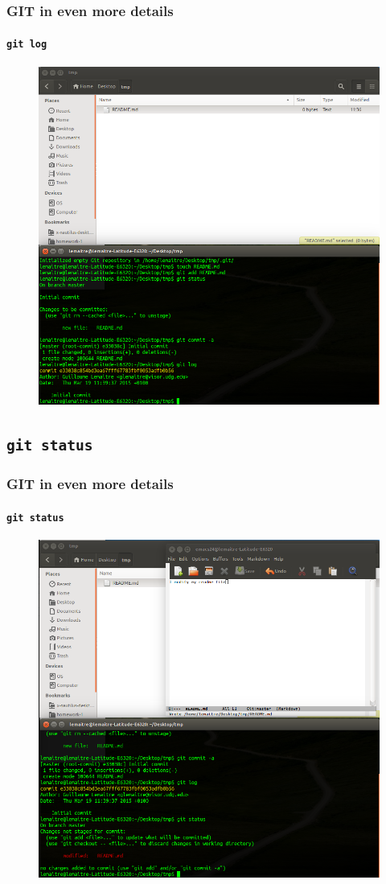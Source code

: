 \documentclass{beamer}
\begin{document}
\begin{frame}
  \frametitle{GIT in even more details}
  \framesubtitle{\texttt{git log}}
  \begin{figure}
      \centering
      \includegraphics[width=.65\textwidth]{./images/workflow/log.png}
    \end{figure}
\end{frame}

\subsection{\texttt{git status}}

\begin{frame}
  \frametitle{GIT in even more details}
  \framesubtitle{\texttt{git status}}
  \begin{figure}
      \centering
      \includegraphics[width=.65\textwidth]{./images/workflow/status_2.png}
    \end{figure}
\end{frame}
\end{document}

